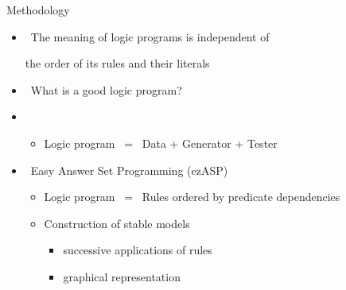 \begin{frame}{Methodology}
  \bigskip
  \begin{itemize}
  \item {} \
    The meaning of logic programs is independent of
    \par
    the order of its rules and their literals
    \smallskip
  \item <2->  \ What is a good logic program?
    \medskip
  \item <3-> 
    \begin{itemize}\normalsize
    \item Logic program \ = \ Data + Generator + Tester
    \end{itemize}
    \medskip
  \item <4->  \pause[5] \ \alert{Easy Answer Set Programming} (ezASP)
    \begin{itemize}\normalsize
    \item<6-> Logic program \ = \ Rules ordered by predicate dependencies
      \medskip
    \item<7-> Construction of stable models
      \begin{itemize}\small
      \item successive applications of rules
      \item graphical representation
      \end{itemize}
    \end{itemize}
  \end{itemize}
\end{frame}
